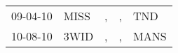 \begin{supertabular}{lllll}
 09-04-10 &  MISS &  , &  , &   TND \\
 10-08-10 &  3WID &  , &  , &  MANS \\
\end{supertabular}
